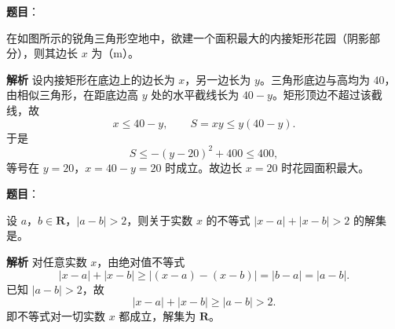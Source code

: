 \begin{answer}

\textbf{题目}：

在如图所示的锐角三角形空地中，欲建一个面积最大的内接矩形花园（阴影部分），则其边长 $x$ 为\gkblank{}（m）。
\nopagebreak[4]
\begin{center}\end{center}
\nopagebreak[4]
\textbf{解析}
设内接矩形在底边上的边长为 $x$，另一边长为 $y$。三角形底边与高均为 $40$，由相似三角形，在距底边高 $y$ 处的水平截线长为 $40-y$。矩形顶边不超过该截线，故
\nopagebreak[4]
\[x\leqslant40-y,\qquad S=xy\leqslant y(40-y).\]
于是
\nopagebreak[4]
\[S\leqslant-(y-20)^2+400\leqslant400,\]
等号在 $y=20$，$x=40-y=20$ 时成立。故边长 $x=20$ 时花园面积最大。


\end{answer}
\begin{answer}

\textbf{题目}：

设 $a$，$b\in\mathbf R$，$|a-b|>2$，则关于实数 $x$ 的不等式 $|x-a|+|x-b|>2$ 的解集是\gkblank{}。

\textbf{解析}
对任意实数 $x$，由绝对值不等式
\nopagebreak[4]
\[|x-a|+|x-b|\geqslant|(x-a)-(x-b)|=|b-a|=|a-b|.\]
已知 $|a-b|>2$，故
\nopagebreak[4]
\[|x-a|+|x-b|\geqslant|a-b|>2.\]
即不等式对一切实数 $x$ 都成立，解集为 $\mathbf R$。


\end{answer}
